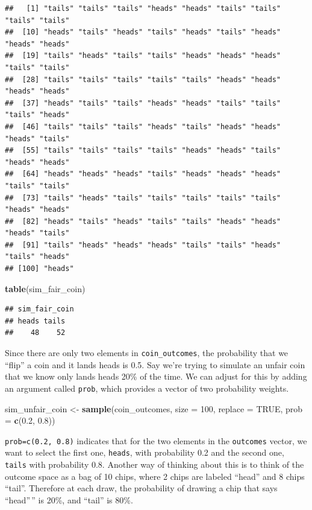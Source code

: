 \documentclass[
]{article}
\newenvironment{Shaded}{\begin{snugshade}}{\end{snugshade}}
\newcommand{\AttributeTok}[1]{\textcolor[rgb]{0.13,0.29,0.53}{#1}}
\newcommand{\ConstantTok}[1]{\textcolor[rgb]{0.56,0.35,0.01}{#1}}
\newcommand{\DecValTok}[1]{\textcolor[rgb]{0.00,0.00,0.81}{#1}}
\newcommand{\FloatTok}[1]{\textcolor[rgb]{0.00,0.00,0.81}{#1}}
\newcommand{\FunctionTok}[1]{\textcolor[rgb]{0.13,0.29,0.53}{\textbf{#1}}}
\newcommand{\NormalTok}[1]{#1}
\newcommand{\OtherTok}[1]{\textcolor[rgb]{0.56,0.35,0.01}{#1}}
\begin{document}
\begin{verbatim}
##   [1] "tails" "tails" "tails" "heads" "heads" "tails" "tails" "tails" "tails"
##  [10] "heads" "tails" "heads" "tails" "heads" "tails" "heads" "heads" "heads"
##  [19] "tails" "heads" "tails" "tails" "heads" "heads" "heads" "tails" "tails"
##  [28] "tails" "tails" "tails" "tails" "tails" "heads" "heads" "heads" "heads"
##  [37] "heads" "tails" "tails" "heads" "heads" "tails" "tails" "tails" "heads"
##  [46] "tails" "tails" "tails" "heads" "tails" "heads" "heads" "heads" "tails"
##  [55] "tails" "tails" "tails" "tails" "heads" "heads" "tails" "heads" "heads"
##  [64] "heads" "heads" "heads" "tails" "heads" "heads" "heads" "tails" "tails"
##  [73] "tails" "heads" "tails" "tails" "tails" "tails" "tails" "heads" "heads"
##  [82] "heads" "tails" "heads" "tails" "tails" "heads" "heads" "heads" "tails"
##  [91] "tails" "heads" "heads" "heads" "tails" "tails" "heads" "tails" "heads"
## [100] "heads"
\end{verbatim}

\begin{Shaded}
\begin{Highlighting}[]
\FunctionTok{table}\NormalTok{(sim\_fair\_coin)}
\end{Highlighting}
\end{Shaded}

\begin{verbatim}
## sim_fair_coin
## heads tails 
##    48    52
\end{verbatim}

Since there are only two elements in \texttt{coin\_outcomes}, the
probability that we ``flip'' a coin and it lands heads is 0.5. Say we're
trying to simulate an unfair coin that we know only lands heads 20\% of
the time. We can adjust for this by adding an argument called
\texttt{prob}, which provides a vector of two probability weights.

\begin{Shaded}
\begin{Highlighting}[]
\NormalTok{sim\_unfair\_coin }\OtherTok{\textless{}{-}} \FunctionTok{sample}\NormalTok{(coin\_outcomes, }\AttributeTok{size =} \DecValTok{100}\NormalTok{, }\AttributeTok{replace =} \ConstantTok{TRUE}\NormalTok{, }
                          \AttributeTok{prob =} \FunctionTok{c}\NormalTok{(}\FloatTok{0.2}\NormalTok{, }\FloatTok{0.8}\NormalTok{))}
\end{Highlighting}
\end{Shaded}

\texttt{prob=c(0.2,\ 0.8)} indicates that for the two elements in the
\texttt{outcomes} vector, we want to select the first one,
\texttt{heads}, with probability 0.2 and the second one, \texttt{tails}
with probability 0.8. Another way of thinking about this is to think of
the outcome space as a bag of 10 chips, where 2 chips are labeled
``head'' and 8 chips ``tail''. Therefore at each draw, the probability
of drawing a chip that says ``head''\,'' is 20\%, and ``tail'' is 80\%.
\end{document}

